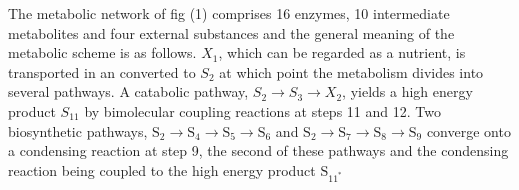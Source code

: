 The metabolic network of fig (1) comprises 16 enzymes, 10 intermediate metabolites and four external substances and the general meaning of the metabolic scheme is as follows. $X_{1}$, which can be regarded as a nutrient, is transported in an converted to $S_{2}$ at which point the metabolism divides into several pathways. A catabolic pathway, $S_{2} \rightarrow S_{3} \rightarrow X_2$, yields a high energy product $S_{11}$ by bimolecular coupling reactions at steps 11 and 12. Two biosynthetic pathways, $\mathrm{S}_{2} \rightarrow \mathrm{S}_{4} \rightarrow \mathrm{S}_{5} \rightarrow \mathrm{S}_{6}$ and $\mathrm{S}_{2} \rightarrow \mathrm{S}_{7} \rightarrow \mathrm{S}_{8} \rightarrow \mathrm{S}_{9}$ converge onto a condensing reaction at step 9, the second of these pathways and the condensing reaction being coupled to the high energy product $\mathrm{S}_{11^{*}}$

